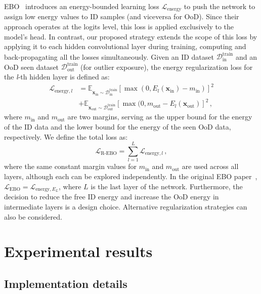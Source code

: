 \documentclass[10pt,twocolumn,a4paper]{article}
\def\rvx{{\mathbf{x}}}
\begin{document}
EBO~\cite{liu2020energy} introduces an energy-bounded learning loss $\mathcal{L}_{\text{energy}}$ to push the network to assign low energy values to ID samples (and viceversa for OoD). Since their approach operates at the logits level, this loss is applied exclusively to the model's head.
In contrast, our proposed strategy extends the scope of this loss by applying it to each hidden convolutional layer during training, computing and back-propagating all the losses simultaneously. Given an ID dataset $\mathcal{D}_{\text{in}}^{\text{train}}$ and an OoD seen dataset $\mathcal{D}_{\text{out}}^{\text{train}}$ (for outlier exposure), the energy regularization loss for the \textit{l}-th hidden layer is defined as:
\begin{equation}\label{eq:3}
    \begin{aligned}
        \mathcal{L}_{\text{energy},l} &= \mathbb{E}_{\rvx_{\text{in}} \sim \mathcal{D}_{\text{in}}^{\text{train}}}[\max(0, E_{l}(\rvx_{\text{in}}) - m_{\text{in}})]^2 \\ &+ \mathbb{E}_{\rvx_{\text{out}} \sim \mathcal{D}_{\text{out}}^{\text{train}}}[\max(0, m_{\text{out}} - E_{l}(\rvx_{\text{out}})]^2\,,
    \end{aligned}
\end{equation}
where $m_{\text{in}}$ and $m_{\text{out}}$ are two margins, serving as the upper bound for the energy of the ID data and the lower bound for the energy of the seen OoD data, respectively. We define the total loss as:
\begin{equation}\label{eq:4}
        \mathcal{L}_{\text{R-EBO}} = \sum_{l=1}^{L} \mathcal{L}_{\text{energy},l}\,,
\end{equation}
where the same constant margin values for $m_{\text{in}}$ and $m_{\text{out}}$ are used across all layers, although each can be explored independently. In the original EBO paper~\cite{liu2020energy}, \mbox{$\mathcal{L}_{\text{EBO}} = \mathcal{L}_{\text{energy},E_{L}}$}, where $L$ is the last layer of the network. Furthermore, the decision to reduce the free ID energy and increase the OoD energy in intermediate layers is a design choice. Alternative regularization strategies can also be considered.

\section{Experimental results}\label{sec:exps}
\subsection{Implementation details}\label{sec:implementation}
\end{document}

